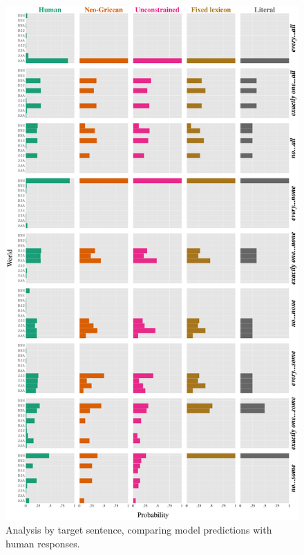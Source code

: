 \documentclass[leqno,12pt]{article}
\begin{document}
\begin{figure}[!t]
  \centering
  \includegraphics[height=0.92\textheight]{fig/allmodels-binary}
  \caption{Analysis by target sentence, comparing model predictions
    with human responses.}
  \label{fig:exp-analysis}
\end{figure}
\end{document}
